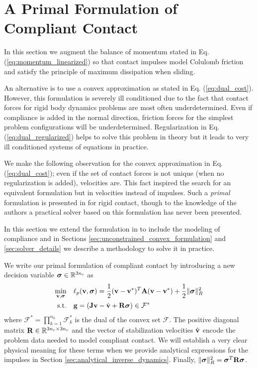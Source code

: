 
\section{A Primal Formulation of Compliant Contact}

In this section we augment the balance of momentum stated in Eq.
(\ref{eq:momentum_linearized}) so that contact impulses model Colulomb friction
and satisfy the principle of maximum dissipation when sliding. 

An alternative is to use a convex approximation as stated in Eq.
(\ref{eq:dual_cost}). However, this formulation is severely ill conditioned due
to the fact that contact forces for rigid body dynamics problems are most often
underdetermined. Even if compliance is added in the normal direction, friction
forces for the simplest problem configurations will be underdetermined.
Regularization in Eq. (\ref{eq:dual_regularized}) helps to solve this problem in
theory but it leads to very ill conditioned systems of equations in practice. 

We make the following observation for the convex approximation in Eq.
(\ref{eq:dual_cost}); even if the set of contact forces is not unique (when no
regularization is added), velocities are. This fact inspired the search
for an equivalent formulation but in velocities instead of impulses. Such a
\textit{primal} formulation is presented in \cite{bib:mazhar2014} for rigid
contact, though to the knowledge of the authors a practical solver based on this
formulation has never been presented.

In this section we extend the formulation in \cite{bib:mazhar2014} to include
the modeling of compliance and in Sections
\ref{sec:unconstrained_convex_formulation} and \ref{sec:solver_details} we
describe a methodology to solve it in practice.

We write our primal formulation of compliant contact by introducing a new
decision variable ${\bm{\sigma}}\in\mathbb{R}^{3n_c}$ as
\begin{equation}
	\begin{aligned}
	\min_{\mf{v},\bsigma} \quad & \ell_p(\mf{v},\bsigma) = \frac{1}{2}(\mf{v}-\mf{v}^*)^T\mf{A}(\mf{v}-\mf{v}^*) + \frac{1}{2} \Vert\bsigma\Vert_{R}^2\\
	\textrm{s.t.} \quad & \mf{g} = (\mf{J}\mf{v}-\hat{\mf{v}} + \mf{R}\bsigma) \in \mathcal{F}^*\\
	\end{aligned}
	\label{eq:primal_regularized}
\end{equation}
where $\mathcal{F^*}=\prod_{k=1}^{n_k}\mathcal{F}^*_k$ is the dual of the convex
set $\mathcal{F}$. The positive diagonal matrix ${\mathbf{R}}\in\mathbb{R}^{3n_c\times
3n_c}$ and the vector of stabilization velocities $\hat{{\mathbf{v}}}$ encode the
problem data needed to model compliant contact. We will establish a very clear
physical meaning for these terms when we provide analytical expressions for the
impulses in Section \ref{sec:analytical_inverse_dynamics}. Finally,
$\Vert{\bm\sigma}\Vert_R^2={\bm\sigma}^T{\mathbf{R}}{\bm\sigma}$.

